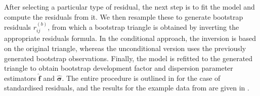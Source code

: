 \documentclass[a4paper]{book}
\begin{document}
After selecting a particular type of residual, the next step is to fit the model and compute the residuals from it. We then resample these to generate bootstrap residuals $r^{(b)}_{ij}$, from which a bootstrap triangle is obtained by inverting the appropriate residuals formula. In the conditional approach, the inversion is based on the original triangle, whereas the unconditional version uses the previously generated bootstrap observations. Finally, the model is refitted to the generated triangle to obtain bootstrap development factor and dispersion parameter estimators $\widehat{\bm{f}}$ and $\widehat{\bm{\sigma}}$. The entire procedure is outlined in  for the case of standardised residuals, and the results for the example data from  are given in .
\end{document}
